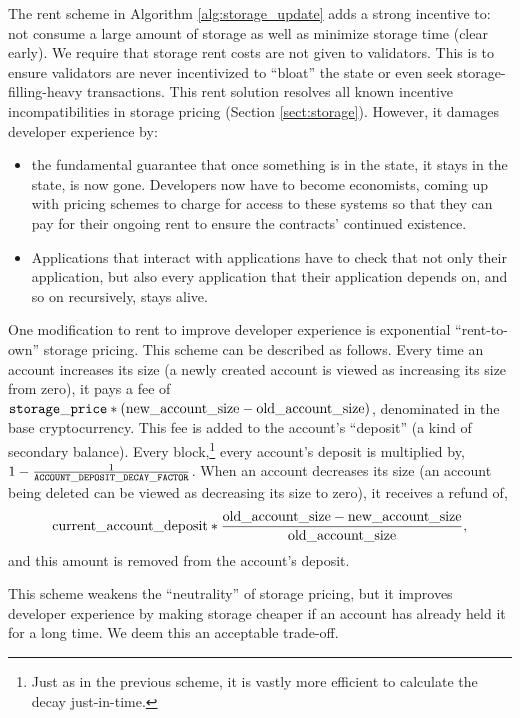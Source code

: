 \documentclass[12pt, final]{article}
\begin{document}
The rent scheme in Algorithm \ref{alg:storage_update} adds a strong incentive to: not consume a large amount of storage as well as minimize storage time (clear early).  We require that storage rent costs are not given to validators.  This is to ensure validators are never incentivized to ``bloat'' the state or even seek storage-filling-heavy transactions.  This rent solution resolves all known incentive incompatibilities in storage pricing (Section \ref{sect:storage}). However, it damages developer experience by:

\begin{itemize}
\item the fundamental guarantee that once something is in the state, it stays in the state, is now gone.  Developers now have to become economists, coming up with pricing schemes to charge for access to these systems so that they can pay for their ongoing rent to ensure the contracts' continued existence. 

\item Applications that interact with applications have to check that not only their application, but also every application that their application depends on, and so on recursively, stays alive.
\end{itemize}


One modification to rent to improve developer experience is exponential ``rent-to-own'' storage pricing.  This scheme can be described as follows. Every time an account increases its size (a newly created account is viewed as increasing its size from zero), it pays a fee of ${\tt{storage\_price}} * (\textnormal{new\_account\_size} - \textnormal{old\_account\_size})$, denominated in the base cryptocurrency. This fee is added to the account's ``deposit'' (a kind of secondary balance). Every block,\footnote{Just as in the previous scheme, it is vastly more efficient to calculate the decay just-in-time.} every account's deposit is multiplied by, $1 - \frac{1}{\tt{ACCOUNT\_DEPOSIT\_DECAY\_FACTOR}}$.  When an account decreases its size (an account being deleted can be viewed as decreasing its size to zero), it receives a refund of,
\begin{equation}
\textnormal{current\_account\_deposit} * \frac{\textnormal{old\_account\_size} - \textnormal{new\_account\_size}}{\textnormal{old\_account\_size}},
\end{equation}
 and this amount is removed from the account's deposit.
 
This scheme weakens the ``neutrality'' of storage pricing, but it improves developer experience by making storage cheaper if an account has already held it for a long time.  We deem this an acceptable trade-off.  
\end{document}
